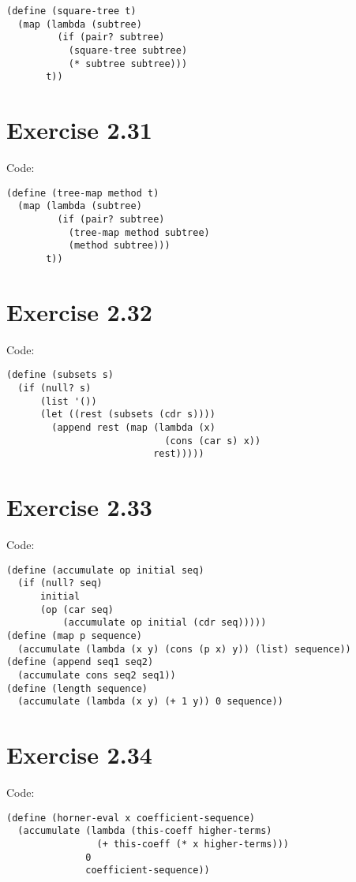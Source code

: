 \documentclass[../main.tex]{subfiles}
\begin{document}
\begin{lstlisting}
(define (square-tree t)
  (map (lambda (subtree)
         (if (pair? subtree)
           (square-tree subtree)
           (* subtree subtree)))
       t))
\end{lstlisting}

\section{Exercise 2.31}

Code:

\begin{lstlisting}
(define (tree-map method t)
  (map (lambda (subtree)
         (if (pair? subtree)
           (tree-map method subtree)
           (method subtree)))
       t))
\end{lstlisting}

\section{Exercise 2.32}

Code:

\begin{lstlisting}
(define (subsets s)
  (if (null? s)
      (list '())
      (let ((rest (subsets (cdr s))))
        (append rest (map (lambda (x)
                            (cons (car s) x))
                          rest)))))
\end{lstlisting}

\section{Exercise 2.33}

Code:

\begin{lstlisting}
(define (accumulate op initial seq)
  (if (null? seq)
      initial
      (op (car seq)
          (accumulate op initial (cdr seq)))))
(define (map p sequence)
  (accumulate (lambda (x y) (cons (p x) y)) (list) sequence))
(define (append seq1 seq2)
  (accumulate cons seq2 seq1))
(define (length sequence)
  (accumulate (lambda (x y) (+ 1 y)) 0 sequence))
\end{lstlisting}

\section{Exercise 2.34}

Code:

\begin{lstlisting}
(define (horner-eval x coefficient-sequence)
  (accumulate (lambda (this-coeff higher-terms)
                (+ this-coeff (* x higher-terms)))
              0
              coefficient-sequence))
\end{lstlisting}
\end{document}
